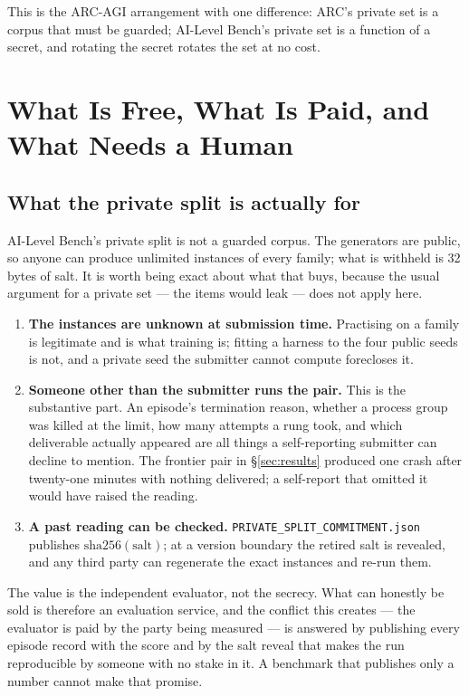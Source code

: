 \documentclass[11pt]{article}
\theoremstyle{definition}
\begin{document}
This is the ARC-AGI arrangement \citep{arc2026} with one difference: ARC's private set is a corpus that must be guarded; AI-Level Bench's private set is a function of a secret, and rotating the secret rotates the set at no cost.

\section{What Is Free, What Is Paid, and What Needs a Human}\label{sec:governance}

\subsection{What the private split is actually for}

AI-Level Bench's private split is not a guarded corpus. The generators are public, so anyone can produce unlimited instances of every family; what is withheld is 32 bytes of salt. It is worth being exact about what that buys, because the usual argument for a private set --- the items would leak --- does not apply here.

\begin{enumerate}[leftmargin=*,itemsep=2pt]
\item \textbf{The instances are unknown at submission time.} Practising on a family is legitimate and is what training is; fitting a harness to the four public seeds is not, and a private seed the submitter cannot compute forecloses it.
\item \textbf{Someone other than the submitter runs the pair.} This is the substantive part. An episode's termination reason, whether a process group was killed at the limit, how many attempts a rung took, and which deliverable actually appeared are all things a self-reporting submitter can decline to mention. The frontier pair in \S\ref{sec:results} produced one crash after twenty-one minutes with nothing delivered; a self-report that omitted it would have raised the reading.
\item \textbf{A past reading can be checked.} \texttt{PRIVATE\_SPLIT\_COMMITMENT.json} publishes $\text{sha256}(\text{salt})$; at a version boundary the retired salt is revealed, and any third party can regenerate the exact instances and re-run them.
\end{enumerate}

The value is the independent evaluator, not the secrecy. What can honestly be sold is therefore an evaluation service, and the conflict this creates --- the evaluator is paid by the party being measured --- is answered by publishing every episode record with the score and by the salt reveal that makes the run reproducible by someone with no stake in it. A benchmark that publishes only a number cannot make that promise.
\end{document}
